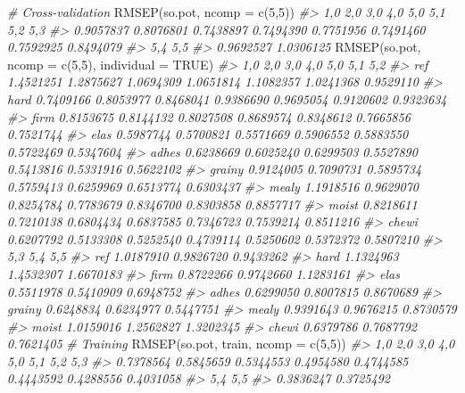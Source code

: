 \documentclass[
]{article}
\newenvironment{Shaded}{\begin{snugshade}}{\end{snugshade}}
\newcommand{\AttributeTok}[1]{\textcolor[rgb]{0.77,0.63,0.00}{#1}}
\newcommand{\CommentTok}[1]{\textcolor[rgb]{0.56,0.35,0.01}{\textit{#1}}}
\newcommand{\ConstantTok}[1]{\textcolor[rgb]{0.00,0.00,0.00}{#1}}
\newcommand{\DecValTok}[1]{\textcolor[rgb]{0.00,0.00,0.81}{#1}}
\newcommand{\FunctionTok}[1]{\textcolor[rgb]{0.00,0.00,0.00}{#1}}
\newcommand{\NormalTok}[1]{#1}
\newcommand{\StringTok}[1]{\textcolor[rgb]{0.31,0.60,0.02}{#1}}
\begin{document}
\begin{Shaded}
\begin{Highlighting}[]
\CommentTok{\# Cross{-}validation}
\FunctionTok{RMSEP}\NormalTok{(so.pot, }\AttributeTok{ncomp =} \FunctionTok{c}\NormalTok{(}\DecValTok{5}\NormalTok{,}\DecValTok{5}\NormalTok{))}
\CommentTok{\#\textgreater{}       1,0       2,0       3,0       4,0       5,0       5,1       5,2       5,3 }
\CommentTok{\#\textgreater{} 0.9057837 0.8076801 0.7438897 0.7494390 0.7751956 0.7491460 0.7592925 0.8494079 }
\CommentTok{\#\textgreater{}       5,4       5,5 }
\CommentTok{\#\textgreater{} 0.9692527 1.0306125}
\FunctionTok{RMSEP}\NormalTok{(so.pot, }\AttributeTok{ncomp =} \FunctionTok{c}\NormalTok{(}\DecValTok{5}\NormalTok{,}\DecValTok{5}\NormalTok{), }\AttributeTok{individual =} \ConstantTok{TRUE}\NormalTok{)}
\CommentTok{\#\textgreater{}              1,0       2,0       3,0       4,0       5,0       5,1       5,2}
\CommentTok{\#\textgreater{} ref    1.4521251 1.2875627 1.0694309 1.0651814 1.1082357 1.0241368 0.9529110}
\CommentTok{\#\textgreater{} hard   0.7409166 0.8053977 0.8468041 0.9386690 0.9695054 0.9120602 0.9323634}
\CommentTok{\#\textgreater{} firm   0.8153675 0.8144132 0.8027508 0.8689574 0.8348612 0.7665856 0.7521744}
\CommentTok{\#\textgreater{} elas   0.5987744 0.5700821 0.5571669 0.5906552 0.5883550 0.5722469 0.5347604}
\CommentTok{\#\textgreater{} adhes  0.6238669 0.6025240 0.6299503 0.5527890 0.5413816 0.5331916 0.5622102}
\CommentTok{\#\textgreater{} grainy 0.9124005 0.7090731 0.5895734 0.5759413 0.6259969 0.6513774 0.6303437}
\CommentTok{\#\textgreater{} mealy  1.1918516 0.9629070 0.8254784 0.7783679 0.8346700 0.8303858 0.8857717}
\CommentTok{\#\textgreater{} moist  0.8218611 0.7210138 0.6804434 0.6837585 0.7346723 0.7539214 0.8511216}
\CommentTok{\#\textgreater{} chewi  0.6207792 0.5133308 0.5252540 0.4739114 0.5250602 0.5372372 0.5807210}
\CommentTok{\#\textgreater{}              5,3       5,4       5,5}
\CommentTok{\#\textgreater{} ref    1.0187910 0.9826720 0.9433262}
\CommentTok{\#\textgreater{} hard   1.1324963 1.4532307 1.6670183}
\CommentTok{\#\textgreater{} firm   0.8722266 0.9742660 1.1283161}
\CommentTok{\#\textgreater{} elas   0.5511978 0.5410909 0.6948752}
\CommentTok{\#\textgreater{} adhes  0.6299050 0.8007815 0.8670689}
\CommentTok{\#\textgreater{} grainy 0.6248834 0.6234977 0.5447751}
\CommentTok{\#\textgreater{} mealy  0.9391643 0.9676215 0.8730579}
\CommentTok{\#\textgreater{} moist  1.0159016 1.2562827 1.3202345}
\CommentTok{\#\textgreater{} chewi  0.6379786 0.7687792 0.7621405}
\CommentTok{\# Training}
\FunctionTok{RMSEP}\NormalTok{(so.pot, }\StringTok{\textquotesingle{}train\textquotesingle{}}\NormalTok{, }\AttributeTok{ncomp =} \FunctionTok{c}\NormalTok{(}\DecValTok{5}\NormalTok{,}\DecValTok{5}\NormalTok{))}
\CommentTok{\#\textgreater{}       1,0       2,0       3,0       4,0       5,0       5,1       5,2       5,3 }
\CommentTok{\#\textgreater{} 0.7378564 0.5845659 0.5344553 0.4954580 0.4744585 0.4443592 0.4288556 0.4031058 }
\CommentTok{\#\textgreater{}       5,4       5,5 }
\CommentTok{\#\textgreater{} 0.3836247 0.3725492}


\end{Highlighting}
\end{Shaded}
\end{document}
